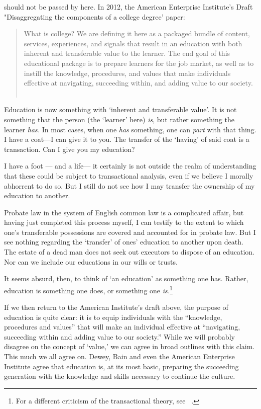  should not be passed by here. In 2012, the American Enterprise Institute's Draft "Disaggregating the components of a college degree' paper:

\begin{quote}

What is college? We are defining it here as a packaged bundle of content, services, experiences, and signals that result in an education with both inherent and transferable value to the learner. The end goal of this educational package is to prepare learners for the job market, as well as to instill the knowledge, procedures, and values that make individuals effective at navigating, succeeding within, and adding value to our society. ~\citep{Stanton:2012vy}
\end{quote}

Education is now something with `inherent and transferable value'. It is not something that the person (the `learner' here) \emph{is}, but rather something the learner \emph{has.} In most cases, when one \emph{has} something, one can \emph{part} with that thing. I have a coat---I can give it to you. The transfer of the `having' of said coat is a transaction. Can I give you my education?

I have a foot --- and a life--- it certainly is not outside the realm of understanding that these could be subject to transactional analysis, even if we believe I morally abhorrent to do so. But I still do not see how I may transfer the ownership of my education to another.

Probate law in the system of English common law is a complicated affair, but having just completed this process myself, I can testify to the extent to which one's transferable possessions are covered and accounted for in probate law. But I see nothing regarding the `transfer' of ones' education to another upon death. The estate of a dead man does not seek out executors to dispose of an education. Nor can we include our educations in our wills or trusts.

It seems absurd, then, to think of `an education' as something one has. Rather, education is something one does, or something one \emph{is.}\footnote{For a different criticism of the transactional theory, see ~\citep{Rawlings:2015wv}.}

If we then return to the American Institute's draft above, the purpose of education is quite clear: it is to equip individuals with the ``knowledge, procedures and values'' that will make an individual effective at ``navigating, succeeding within and adding value to our society.'' While we will probably disagree on the concept of `value,' we can agree in broad outlines with this claim. This much we all agree on. Dewey, Bain and even the American Enterprise Institute agree that education is, at its most basic, preparing the succeeding generation with the knowledge and skills necessary to continue the culture.

